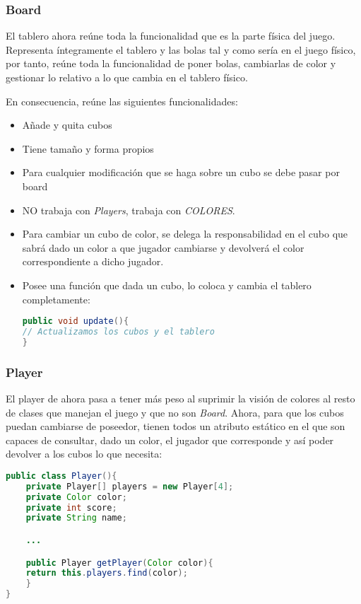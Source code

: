 \documentclass{article}
\begin{document}
\subsubsection*{Board}
El tablero ahora reúne toda la funcionalidad que es la parte física del juego. Representa íntegramente el tablero y las bolas tal y como sería en el juego físico, por tanto, reúne toda la funcionalidad de poner bolas, cambiarlas de color y gestionar lo relativo a lo que cambia en el tablero físico.

En consecuencia, reúne las siguientes funcionalidades:
\begin{itemize}
\item Añade y quita cubos
\item Tiene tamaño y forma propios
\item Para cualquier modificación que se haga sobre un cubo se debe pasar por board
\item NO trabaja con \textit{Players}, trabaja con \textit{COLORES}.
\item Para cambiar un cubo de color, se delega la responsabilidad en el cubo que sabrá dado un color a que jugador cambiarse y devolverá el color correspondiente a dicho jugador.
\item Posee una función que dada un cubo, lo coloca y cambia el tablero completamente:
\begin{lstlisting}[language=Java]
public void update(){
// Actualizamos los cubos y el tablero
}
\end{lstlisting}
\end{itemize}

\subsubsection*{Player}
El player de ahora pasa a tener más peso al suprimir la visión de colores al resto de clases que manejan el juego y que no son \textit{Board}. Ahora, para que los cubos puedan cambiarse de poseedor, tienen todos un atributo estático en el que son capaces de consultar, dado un color, el jugador que corresponde y así poder devolver a los cubos lo que necesita:
\begin{lstlisting}[language=Java]
public class Player(){
	private Player[] players = new Player[4];
	private Color color;
	private int score;
	private String name;

	...

	public Player getPlayer(Color color){
	return this.players.find(color);
	}
}
\end{lstlisting}
\end{document}
